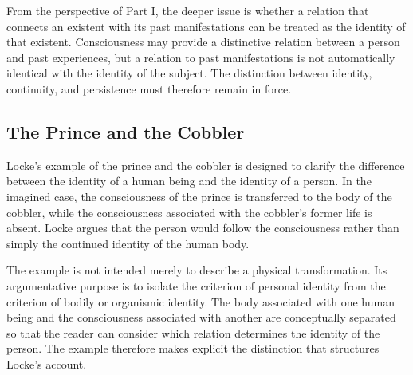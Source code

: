\label{para:VS.B01.P01.C08.S08.SS08.P006}

From the perspective of Part I, the deeper issue
is whether a relation that connects an existent
with its past manifestations can be treated as
the identity of that existent. Consciousness may
provide a distinctive relation between a person
and past experiences, but a relation to past
manifestations is not automatically identical
with the identity of the subject. The distinction
between identity, continuity, and persistence
must therefore remain in force. 



\subsection{The Prince and the Cobbler}
\label{subsec:ch08-locke-prince-cobbler}

\label{para:VS.B01.P01.C08.S08.SS09.P001}

Locke's example of the prince and the cobbler
is designed to clarify the difference between
the identity of a human being and the identity
of a person. In the imagined case, the consciousness
of the prince is transferred to the body of the
cobbler, while the consciousness associated with
the cobbler's former life is absent. Locke argues
that the person would follow the consciousness
rather than simply the continued identity of the
human body. \cite[II.xxvii.15]{LockeEssay}

\label{para:VS.B01.P01.C08.S08.SS09.P002}

The example is not intended merely to describe
a physical transformation. Its argumentative
purpose is to isolate the criterion of personal
identity from the criterion of bodily or organismic
identity. The body associated with one human
being and the consciousness associated with
another are conceptually separated so that the
reader can consider which relation determines
the identity of the person. The example therefore
makes explicit the distinction that structures
Locke's account.

\label{para:VS.B01.P01.C08.S08.SS09.P003}

